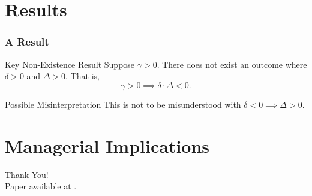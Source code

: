 \documentclass[10pt, mathserif, aspectratio = 169]{beamer}
\begin{document}
\section{Results}

\begin{frame}
\frametitle{A Result}
\pause
\begin{block}{Key Non-Existence Result}
Suppose $\gamma > 0$. There does not exist an outcome where $\delta > 0$ and $\Delta > 0$. That is,
\begin{equation*}
\gamma > 0 \implies \delta \cdot \Delta < 0.
\end{equation*}
\end{block}
\pause
\begin{block}{Possible Misinterpretation}
This is not to be misunderstood with $\delta < 0 \implies \Delta > 0$.
\end{block}

\end{frame}

\section[Implications]{Managerial Implications}

\begin{frame}
\begin{center}
\textcolor{asumaroon}{\Large{Thank You!}}\\ \smallskip
Paper available at \texttt{}.
\end{center}
\end{frame}
\end{document}
